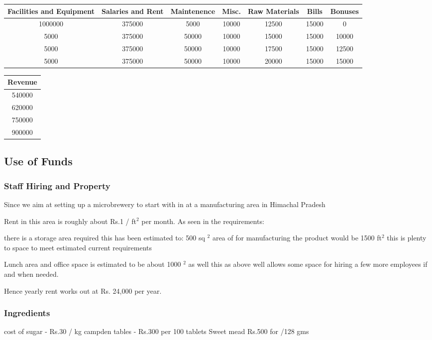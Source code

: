 \documentclass[11pt]{article}
\begin{document}
\begin{center}
\begin{tabular}{| c | c | c | c | c | c | c |}
\hline
Facilities and Equipment & Salaries and Rent  & Maintenence & Misc. & Raw Materials & Bills & Bonuses \\ \hline
1000000 & 375000 & 5000 & 10000 & 12500 & 15000 & 0 \\
5000 & 375000 & 50000 & 10000 & 15000 & 15000 & 10000 \\
5000 & 375000 & 50000 & 10000 & 17500 & 15000 & 12500 \\
5000 & 375000 & 50000 & 10000 & 20000 & 15000 & 15000 \\ \hline
\end{tabular}
\end{center}

\begin{center}
\begin{tabular}{| c | }
\hline
Revenue \\ \hline
540000 \\
620000 \\
750000 \\
900000 \\ \hline
\end{tabular}
\end{center}

  \subsection{Use of Funds}
      \subsubsection{Staff Hiring and Property}
Since we aim at setting up a microbrewery to start with in at a manufacturing area in Himachal Pradesh

Rent in this area is roughly about Rs.1 / ft$^2$ per month.
As seen in the requirements:

there is a storage area required this has been estimated to: 500 sq $^2$ area of for manufacturing the product would be 1500 ft$^2$ this is plenty to space to meet estimated current requirements

Lunch area and office space is estimated to be about 1000 $^2$ as well this as above well allows some space for hiring a few more employees if and when needed.

Hence yearly rent works out at Rs. 24,000 per year.
   \subsubsection{Ingredients}
cost of sugar -  Rs.30 / kg
campden tables  - Rs.300 per 100 tablets
Sweet mead Rs.500 for /128 gms 
\end{document}
